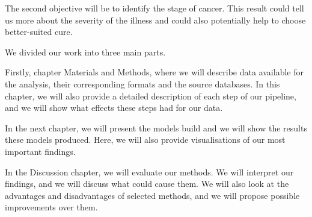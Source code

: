 The second objective will be to identify the stage of cancer.
This result could tell us more about the severity of the illness and could also potentially help to choose better-suited cure.

We divided our work into three main parts.

Firstly, chapter Materials and Methods, where we will describe data available for the analysis, their corresponding formats and the source databases. 
In this chapter, we will also provide a detailed description of each step of our pipeline, and we will show what effects these steps had for our data.

In the next chapter, we will present the models build and we will show the results these models produced.
Here, we will also provide visualisations of our most important findings.

In the Discussion chapter, we will evaluate our methods.
We will interpret our findings, and we will discuss what could cause them.
We will also look at the advantages and disadvantages of selected methods, and we will propose possible improvements over them.
